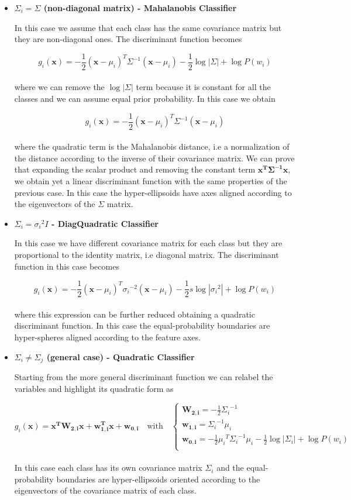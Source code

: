 \documentclass{standalone}
\begin{document}
\begin{itemize}
\item \textbf{$\Sigma_i = \Sigma$ (non-diagonal matrix) - Mahalanobis Classifier}

In this case we assume that each class has the same covariance matrix but they are non-diagonal ones.
The discriminant function becomes

$$
g_i(\mathbf{x}) = -\frac{1}{2}(\mathbf{x}-\mu_i)^T{\Sigma}^{-1}(\mathbf{x}-\mu_i) -\frac{1}{2}\log\left|\Sigma\right|+\log P(w_i)
$$
\\
where we can remove the $\log\left|\Sigma\right|$ term because it is constant for all the classes and we can assume equal prior probability.
In this case we obtain

$$
g_i(\mathbf{x}) = -\frac{1}{2}(\mathbf{x}-\mu_i)^T{\Sigma}^{-1}(\mathbf{x}-\mu_i)
$$
\\
where the quadratic term is the Mahalanobis distance, i.e a normalization of the distance according to the inverse of their covariance matrix.
We can prove that expanding the scalar product and removing the constant term $\mathbf{x^T\Sigma^{-1}x}$, we obtain yet a linear discriminant function with the same properties of the previous case.
In this case the hyper-ellipsoids have axes aligned according to the eigenvectors of the $\Sigma$ matrix.


\item \textbf{$\Sigma_i = {\sigma_i}^2I$ - DiagQuadratic Classifier}

In this case we have different covariance matrix for each class but they are proportional to the identity matrix, i.e diagonal matrix.
The discriminant function in this case becomes

$$
g_i(\mathbf{x}) = -\frac{1}{2}(\mathbf{x}-\mu_i)^T{\sigma_i}^{-2}(\mathbf{x}-\mu_i) -\frac{1}{2}s\log\left|{\sigma_i}^2\right|+\log P(w_i)
$$
\\
where this expression can be further reduced obtaining a quadratic discriminant function.
In this case the equal-probability boundaries are hyper-spheres aligned according to the feature axes.


\item \textbf{$\Sigma_i \neq\Sigma_j$ (general case) - Quadratic Classifier}

Starting from the more general discriminant function we can relabel the variables and highlight its quadratic form as

$$
g_i(\mathbf{x}) = \mathbf{x^TW_{2,i}x}+\mathbf{w_{1,i}^Tx} + \mathbf{w_{0,i}} \quad \mbox{with}\quad \left\{\begin{array}{l} \mathbf{W_{2,i}}=-\frac{1}{2}{\Sigma_i}^{-1}\\ \mathbf{w_{1,i}}={\Sigma_i}^{-1}\mu_i \\ \mathbf{w_{0,i}}=-\frac{1}{2}{\mu_i}^T{\Sigma_i}^{-1}\mu_i-\frac{1}{2}\log\left|\Sigma_i\right|+\log P(w_i) \\ \end{array}\right.
$$
\\
In this case each class has its own covariance matrix $\Sigma_i$ and the equal-probability boundaries are hyper-ellipsoids oriented according to the eigenvectors of the covariance matrix of each class.


\end{itemize}
\end{document}
